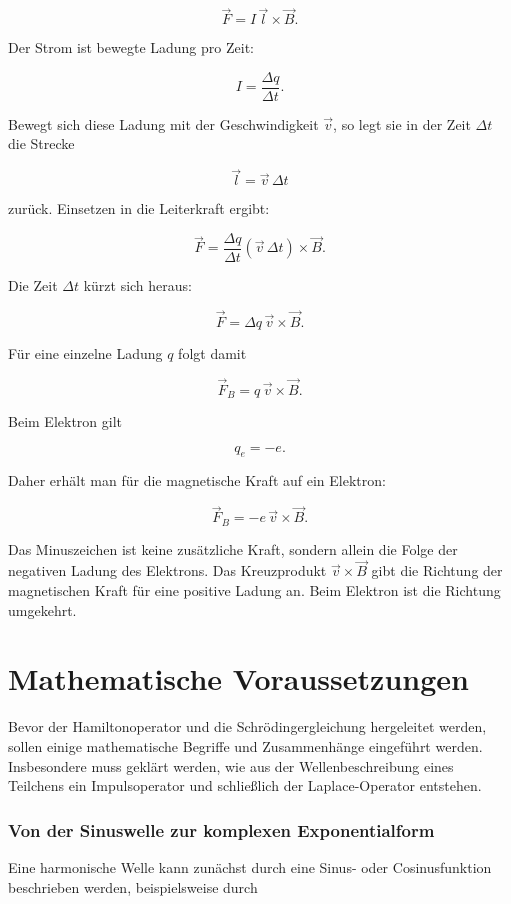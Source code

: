 \[
\vec{F} = I\,\vec{l} \times \vec{B}.
\]

Der Strom ist bewegte Ladung pro Zeit:

\[
I = \frac{\Delta q}{\Delta t}.
\]

Bewegt sich diese Ladung mit der Geschwindigkeit \(\vec{v}\), so legt sie
in der Zeit \(\Delta t\) die Strecke

\[
\vec{l} = \vec{v}\,\Delta t
\]

zurück. Einsetzen in die Leiterkraft ergibt:

\[
\vec{F}
=
\frac{\Delta q}{\Delta t}
\left(\vec{v}\,\Delta t\right)
\times \vec{B}.
\]

Die Zeit \(\Delta t\) kürzt sich heraus:

\[
\vec{F}
=
\Delta q\,\vec{v} \times \vec{B}.
\]

Für eine einzelne Ladung \(q\) folgt damit

\[
\vec{F}_B = q\,\vec{v} \times \vec{B}.
\]

Beim Elektron gilt

\[
q_e = -e.
\]

Daher erhält man für die magnetische Kraft auf ein Elektron:

\[
\vec{F}_B = -e\,\vec{v} \times \vec{B}.
\]

Das Minuszeichen ist keine zusätzliche Kraft, sondern allein die Folge der
negativen Ladung des Elektrons. Das Kreuzprodukt \(\vec{v} \times \vec{B}\)
gibt die Richtung der magnetischen Kraft für eine positive Ladung an. Beim
Elektron ist die Richtung umgekehrt.


\section{Mathematische Voraussetzungen}
\label{subsec:mathematische_voraussetzungen_schroedinger}

Bevor der Hamiltonoperator und die Schrödingergleichung hergeleitet werden,
sollen einige mathematische Begriffe und Zusammenhänge eingeführt werden.
Insbesondere muss geklärt werden, wie aus der Wellenbeschreibung eines
Teilchens ein Impulsoperator und schließlich der Laplace-Operator entstehen.

\subsubsection*{Von der Sinuswelle zur komplexen Exponentialform}

Eine harmonische Welle kann zunächst durch eine Sinus- oder Cosinusfunktion
beschrieben werden, beispielsweise durch


